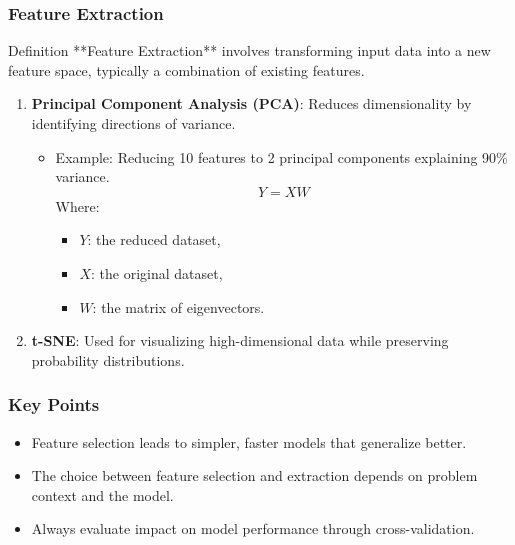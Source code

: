 \documentclass[aspectratio=169]{beamer}
\begin{document}
\begin{frame}[fragile]
    \frametitle{Feature Extraction}
    \begin{block}{Definition}
        **Feature Extraction** involves transforming input data into a new feature space, typically a combination of existing features.
    \end{block}
    
    \begin{enumerate}
        \item \textbf{Principal Component Analysis (PCA)}: Reduces dimensionality by identifying directions of variance.
            \begin{itemize}
                \item Example: Reducing 10 features to 2 principal components explaining 90\% variance.
                \begin{equation}
                    Y = XW
                \end{equation}
                Where:
                \begin{itemize}
                    \item $Y$: the reduced dataset,
                    \item $X$: the original dataset,
                    \item $W$: the matrix of eigenvectors.
                \end{itemize}
            \end{itemize}
        
        \item \textbf{t-SNE}: Used for visualizing high-dimensional data while preserving probability distributions.
    \end{enumerate}
\end{frame}

\begin{frame}[fragile]
    \frametitle{Key Points}
    \begin{itemize}
        \item Feature selection leads to simpler, faster models that generalize better.
        \item The choice between feature selection and extraction depends on problem context and the model.
        \item Always evaluate impact on model performance through cross-validation.
    \end{itemize}
\end{frame}
\end{document}
